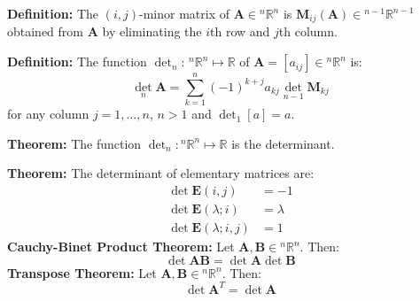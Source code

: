\documentclass{article}
\newcommand{\bff}[1]{\mathbf{#1}}
\begin{document}
\begin{minipage}[t]{0.45\linewidth}
        \textbf{Definition:} The $(i,j)$-minor matrix of $\bff{A} \in {^n}\mathbb{R}^n$ is $\mathbf{M}_{ij}(\bff{A}) \in {^{n-1}}\mathbb{R}^{n-1}$ obtained from $\bff{A}$ by eliminating the $i$th row and $j$th column.
        \vspace{2mm}

        \textbf{Definition:} The function $\det_n:\, {^n}\mathbb{R}^n \mapsto \mathbb{R}$ of $\bff{A} = [a_{ij}] \in {^n}\mathbb{R}^n$ is:
        \begin{equation*}
            \det_n \bff{A} = \sum_{k=1}^n (-1)^{k+j}a_{kj}\det_{n-1}\bff{M}_{kj}
        \end{equation*}
        for any column $j=1,\dots,n$, $n>1$ and $\det_1[a]=a$.
        \vspace{2mm}

        \textbf{Theorem:} The function $\det_n: {^n}\mathbb{R}^n \mapsto \mathbb{R}$ is the determinant.
        \vspace{2mm}

        \textbf{Theorem:} The determinant of elementary matrices are:
        \begin{align*}
            \det \bff{E}(i,j) &= -1 \\ 
            \det \bff{E}(\lambda;i) &= \lambda \\ 
            \det \bff{E}(\lambda; i,j) &= 1 
        \end{align*}
        \textbf{Cauchy-Binet Product Theorem:} Let $\bff{A},\bff{B} \in {^n}\mathbb{R}^n$. Then:
        \begin{equation*}
            \det \bff{AB} = \det \bff{A} \det\bff{B}
        \end{equation*}
        \textbf{Transpose Theorem:}  Let $\bff{A},\bff{B} \in {^n}\mathbb{R}^n$. Then:
        \begin{equation*}
            \det \bff{A}^T = \det \bff{A}
        \end{equation*}
    \end{minipage}\hfill
\end{document}
